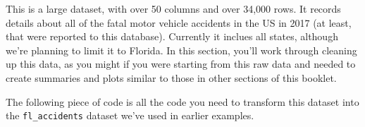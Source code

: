 \documentclass[]{tufte-book}
\newenvironment{Shaded}{}{}
\newcommand{\DataTypeTok}[1]{\textcolor[rgb]{0.56,0.13,0.00}{#1}}
\newcommand{\DecValTok}[1]{\textcolor[rgb]{0.25,0.63,0.44}{#1}}
\newcommand{\KeywordTok}[1]{\textcolor[rgb]{0.00,0.44,0.13}{\textbf{#1}}}
\newcommand{\NormalTok}[1]{#1}
\newcommand{\OperatorTok}[1]{\textcolor[rgb]{0.40,0.40,0.40}{#1}}
\newcommand{\StringTok}[1]{\textcolor[rgb]{0.25,0.44,0.63}{#1}}
\begin{document}
This is a large dataset, with over 50 columns and over 34,000 rows. It records details about all of
the fatal motor vehicle accidents in the US in 2017 (at least, that were reported to this database).
Currently it inclues all states, although we're planning to limit it to Florida.
In this section, you'll work through cleaning up this data, as you might if you were starting
from this raw data and needed to create summaries and plots similar to those in other sections of
this booklet.

The following piece of code is all the code you need to transform this dataset into the
\texttt{fl\_accidents} dataset we've used in earlier examples.

\begin{Shaded}
\end{Shaded}
\end{document}
